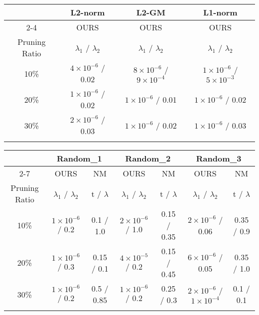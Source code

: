 \begin{table*}[h]
\centering 
\scriptsize
\begin{tabular}{c|c|c|c}\Xhline{2\arrayrulewidth}
\multirow{2}{*}{Criterion} & L2-norm& L2-GM & L1-norm\\ \cline{2-4} 
& OURS& OURS& OURS\\ \hline
Pruning Ratio& $\lambda_1$ / $\lambda_2$    & $\lambda_1$ / $\lambda_2$  & $\lambda_1$ / $\lambda_2$  \\\Xhline{2\arrayrulewidth}
10\%  & $4\times10^{-6}$ / 0.02 & $8\times10^{-6}$ / $9\times10^{-4}$   &  $1\times10^{-6}$ / $5\times10^{-3}$ \\ \hline
20\%  & $1\times10^{-6}$ / 0.02 & $1\times10^{-6}$ / 0.01               & $1\times10^{-6}$ / 0.02 \\ \hline
30\%  & $2\times10^{-6}$ / 0.03 & $1\times10^{-6}$ / 0.02               & $1\times10^{-6}$ / 0.03 \\ \Xhline{2\arrayrulewidth}
\end{tabular}%
\vspace{1mm}
\begin{tabular}{c|c|c|c|c|c|c}\Xhline{2\arrayrulewidth}
\multirow{2}{*}{Criterion} & \multicolumn{2}{c|}{Random\_1}& \multicolumn{2}{c|}{Random\_2}& \multicolumn{2}{c}{Random\_3}\\ \cline{2-7} 
    & OURS& NM& OURS& NM& OURS& NM\\ \hline
Pruning Ratio& $\lambda_1$ / $\lambda_2$ & t / $\lambda$ & $\lambda_1$ / $\lambda_2$ & t / $\lambda$ & $\lambda_1$ / $\lambda_2$ & t / $\lambda$ \\ \Xhline{2\arrayrulewidth}
10\%& $1\times10^{-6}$ / 0.2 & 0.1 / 1.0      & $2\times10^{-6}$ / 1.0   & 0.15 / 0.35   & $2\times10^{-6}$ / 0.06   & 0.35 / 0.9 \\ \hline
20\%& $1\times10^{-6}$ / 0.3  & 0.15 / 0.1    & $4\times10^{-5}$ / 0.2   & 0.15 / 0.45   & $6\times10^{-6}$ / 0.05    & 0.35 / 1.0 \\ \hline
30\%& $1\times10^{-6}$ / 0.2  & 0.5 / 0.85    & $1\times10^{-6}$ / 0.2   & 0.25 / 0.3   & $2\times10^{-6}$ / $1\times10^{-4}$   & 0.1 / 0.1 \\ \Xhline{2\arrayrulewidth}
\end{tabular}%
\caption{hyperparameters of ResNet101 on ImageNet}
\label{tab:param:ResNet101:ResNet101}
\end{table*}








